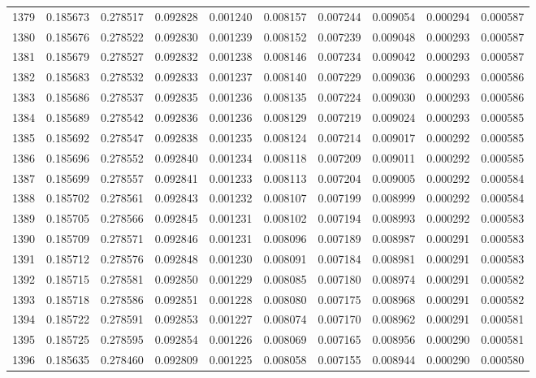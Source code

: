 \begin{tabular}{lrrrrrrrrr}
1379 & 0.185673 & 0.278517 & 0.092828 & 0.001240 & 0.008157 & 0.007244 & 0.009054 & 0.000294 & 0.000587 \\
1380 & 0.185676 & 0.278522 & 0.092830 & 0.001239 & 0.008152 & 0.007239 & 0.009048 & 0.000293 & 0.000587 \\
1381 & 0.185679 & 0.278527 & 0.092832 & 0.001238 & 0.008146 & 0.007234 & 0.009042 & 0.000293 & 0.000587 \\
1382 & 0.185683 & 0.278532 & 0.092833 & 0.001237 & 0.008140 & 0.007229 & 0.009036 & 0.000293 & 0.000586 \\
1383 & 0.185686 & 0.278537 & 0.092835 & 0.001236 & 0.008135 & 0.007224 & 0.009030 & 0.000293 & 0.000586 \\
1384 & 0.185689 & 0.278542 & 0.092836 & 0.001236 & 0.008129 & 0.007219 & 0.009024 & 0.000293 & 0.000585 \\
1385 & 0.185692 & 0.278547 & 0.092838 & 0.001235 & 0.008124 & 0.007214 & 0.009017 & 0.000292 & 0.000585 \\
1386 & 0.185696 & 0.278552 & 0.092840 & 0.001234 & 0.008118 & 0.007209 & 0.009011 & 0.000292 & 0.000585 \\
1387 & 0.185699 & 0.278557 & 0.092841 & 0.001233 & 0.008113 & 0.007204 & 0.009005 & 0.000292 & 0.000584 \\
1388 & 0.185702 & 0.278561 & 0.092843 & 0.001232 & 0.008107 & 0.007199 & 0.008999 & 0.000292 & 0.000584 \\
1389 & 0.185705 & 0.278566 & 0.092845 & 0.001231 & 0.008102 & 0.007194 & 0.008993 & 0.000292 & 0.000583 \\
1390 & 0.185709 & 0.278571 & 0.092846 & 0.001231 & 0.008096 & 0.007189 & 0.008987 & 0.000291 & 0.000583 \\
1391 & 0.185712 & 0.278576 & 0.092848 & 0.001230 & 0.008091 & 0.007184 & 0.008981 & 0.000291 & 0.000583 \\
1392 & 0.185715 & 0.278581 & 0.092850 & 0.001229 & 0.008085 & 0.007180 & 0.008974 & 0.000291 & 0.000582 \\
1393 & 0.185718 & 0.278586 & 0.092851 & 0.001228 & 0.008080 & 0.007175 & 0.008968 & 0.000291 & 0.000582 \\
1394 & 0.185722 & 0.278591 & 0.092853 & 0.001227 & 0.008074 & 0.007170 & 0.008962 & 0.000291 & 0.000581 \\
1395 & 0.185725 & 0.278595 & 0.092854 & 0.001226 & 0.008069 & 0.007165 & 0.008956 & 0.000290 & 0.000581 \\
1396 & 0.185635 & 0.278460 & 0.092809 & 0.001225 & 0.008058 & 0.007155 & 0.008944 & 0.000290 & 0.000580 \\

\end{tabular}
